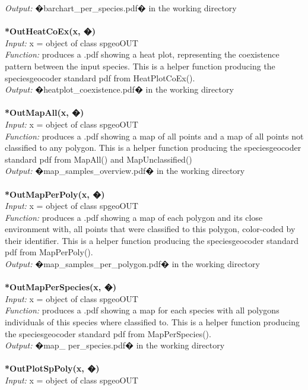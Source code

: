 \documentclass[a4paper,titlepage,11pt]{scrreprt}
\begin{document}
\textit{Output:} �barchart\_per\_species.pdf� in the working directory\\
\\
\textbf{*OutHeatCoEx(x, �)}\\
\textit{Input:} x = object of class spgeoOUT\\
\textit{Function:} produces a .pdf showing a heat plot, representing the coexistence pattern between the input species. This is a helper function producing the speciesgeocoder standard pdf from HeatPlotCoEx().\\
\textit{Output:} �heatplot\_coexistence.pdf� in the working directory\\
\\
\textbf{*OutMapAll(x, �)}\\
\textit{Input:} x = object of class spgeoOUT\\
\textit{Function:} produces a .pdf showing a map of all points and a map of all points not classified to any polygon. This is a helper function producing the speciesgeocoder standard pdf from MapAll() and MapUnclassified()\\
\textit{Output:} �map\_samples\_overview.pdf� in the working directory\\
\\
\textbf{*OutMapPerPoly(x, �)}\\
\textit{Input:} x = object of class spgeoOUT\\
\textit{Function:} produces a .pdf showing a map of each polygon and its close environment with, all points that were classified to this polygon, color-coded by their identifier. This is a helper function producing the speciesgeocoder standard pdf from MapPerPoly().\\
\textit{Output:} �map\_samples\_per\_polygon.pdf� in the working directory\\
\\
\textbf{*OutMapPerSpecies(x, �)}\\
\textit{Input:} x = object of class spgeoOUT\\
\textit{Function:} produces a .pdf showing a map for each species with all polygons individuals of this species where classified to. This is a helper function producing the speciesgeocoder standard pdf from MapPerSpecies().\\
\textit{Output:} �map\_ per\_species.pdf� in the working directory\\
\\
\textbf{*OutPlotSpPoly(x, �)}\\
\textit{Input:} x = object of class spgeoOUT\\
\end{document}

